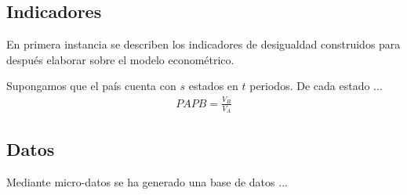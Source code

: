 \documentclass[11pt]{article}
\begin{document}
\subsection{Indicadores}

En primera instancia se describen los indicadores de desigualdad construidos para después elaborar sobre el modelo econométrico. 

Supongamos que el país cuenta con $s$ estados en $t$ periodos. De cada estado ...
%
\begin{eqnarray*}
PAPB = \frac{V_B}{V_A}
\end{eqnarray*} \vspace*{0cm}
 
 

\subsection{Datos}

Mediante micro-datos se ha generado una base de datos ...
\end{document}
